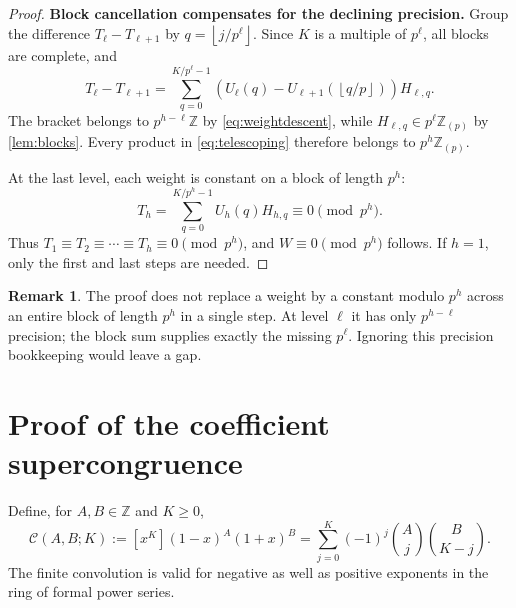 \documentclass[11pt,a4paper]{article}
\numberwithin{equation}{section}
\theoremstyle{research}
\theoremstyle{definition}
\newtheorem{remark}[theorem]{Remark}
\newcommand{\Z}{\mathbb Z}
\newcommand{\Zloc}{\mathbb Z_{(p)}}
\newcommand{\CC}{\mathcal C}
\newcommand{\floor}[1]{\left\lfloor #1\right\rfloor}
\begin{document}
\begin{proof}
\textbf{Block cancellation compensates for the declining precision.}
Group the difference $T_\ell-T_{\ell+1}$ by $q=\floor{j/p^\ell}$.
Since $K$ is a multiple of $p^\ell$, all blocks are complete, and
\begin{equation}\label{eq:telescoping}
 T_\ell-T_{\ell+1}
 =\sum_{q=0}^{K/p^\ell-1}
   \left(U_\ell(q)-U_{\ell+1}(\floor{q/p})\right)H_{\ell,q}.
\end{equation}
The bracket belongs to $p^{h-\ell}\Z$ by
\eqref{eq:weightdescent}, while $H_{\ell,q}\in p^\ell\Zloc$ by
\cref{lem:blocks}. Every product in \eqref{eq:telescoping} therefore
belongs to $p^h\Zloc$.

At the last level, each weight is constant on a block of length $p^h$:
\[
 T_h=\sum_{q=0}^{K/p^h-1}U_h(q)H_{h,q}\equiv0\pmod{p^h}.
\]
Thus $T_1\equiv T_2\equiv\cdots\equiv T_h\equiv0\pmod{p^h}$,
and $W\equiv0\pmod{p^h}$ follows. If $h=1$, only the first and last
steps are needed.
\end{proof}

\begin{remark}
The proof does not replace a weight by a constant modulo $p^h$ across an
entire block of length $p^h$ in a single step. At level $\ell$ it has only
$p^{h-\ell}$ precision; the block sum supplies exactly the missing
$p^\ell$. Ignoring this precision bookkeeping would leave a gap.
\end{remark}

\section{Proof of the coefficient supercongruence}
\label{sec:proof}
Define, for $A,B\in\Z$ and $K\ge0$,
\begin{equation}\label{eq:localcoefficient}
 \CC(A,B;K):=[x^K](1-x)^A(1+x)^B
 =\sum_{j=0}^K(-1)^j\binom Aj\binom B{K-j}.
\end{equation}
The finite convolution is valid for negative as well as positive
exponents in the ring of formal power series.
\end{document}
